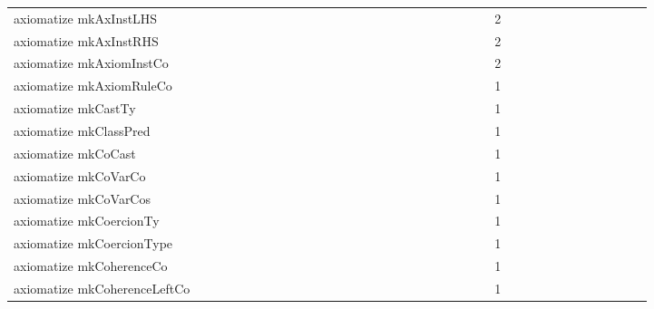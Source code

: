{\begin{tabular}{l|rrr|rrr|rrr}
axiomatize mkAxInstLHS &  &  &  &  &  &  &  &  &  &  &  &  &  &  &  &  &  &  &  &  &  &  &  & 2 &  &  &  &  &  &  &  &  &  &  &  & \\
axiomatize mkAxInstRHS &  &  &  &  &  &  &  &  &  &  &  &  &  &  &  &  &  &  &  &  &  &  &  & 2 &  &  &  &  &  &  &  &  &  &  &  & \\
axiomatize mkAxiomInstCo &  &  &  &  &  &  &  &  &  &  &  &  &  &  &  &  &  &  &  &  &  &  &  & 2 &  &  &  &  &  &  &  &  &  &  &  & \\
axiomatize mkAxiomRuleCo &  &  &  &  &  &  &  &  &  &  &  &  &  &  &  &  &  &  &  &  &  &  &  & 1 &  &  &  &  &  &  &  &  &  &  &  & \\
axiomatize mkCastTy &  &  &  &  &  &  &  &  &  &  &  &  &  &  &  &  &  &  &  &  &  &  &  & 1 &  &  &  &  &  &  &  &  &  &  &  & \\
axiomatize mkClassPred &  &  &  &  &  &  &  &  &  &  &  &  &  &  &  &  &  &  &  &  &  &  &  & 1 &  &  &  &  &  &  &  &  &  &  &  & \\
axiomatize mkCoCast &  &  &  &  &  &  &  &  &  &  &  &  &  &  &  &  &  &  &  &  &  &  &  & 1 &  &  &  &  &  &  &  &  &  &  &  & \\
axiomatize mkCoVarCo &  &  &  &  &  &  &  &  &  &  &  &  &  &  &  &  &  &  &  &  &  &  &  & 1 &  &  &  &  &  &  &  &  &  &  &  & \\
axiomatize mkCoVarCos &  &  &  &  &  &  &  &  &  &  &  &  &  &  &  &  &  &  &  &  &  &  &  & 1 &  &  &  &  &  &  &  &  &  &  &  & \\
axiomatize mkCoercionTy &  &  &  &  &  &  &  &  &  &  &  &  &  &  &  &  &  &  &  &  &  &  &  & 1 &  &  &  &  &  &  &  &  &  &  &  & \\
axiomatize mkCoercionType &  &  &  &  &  &  &  &  &  &  &  &  &  &  &  &  &  &  &  &  &  &  &  & 1 &  &  &  &  &  &  &  &  &  &  &  & \\
axiomatize mkCoherenceCo &  &  &  &  &  &  &  &  &  &  &  &  &  &  &  &  &  &  &  &  &  &  &  & 1 &  &  &  &  &  &  &  &  &  &  &  & \\
axiomatize mkCoherenceLeftCo &  &  &  &  &  &  &  &  &  &  &  &  &  &  &  &  &  &  &  &  &  &  &  & 1 &  &  &  &  &  &  &  &  &  &  &  & \\

\end{tabular}}
